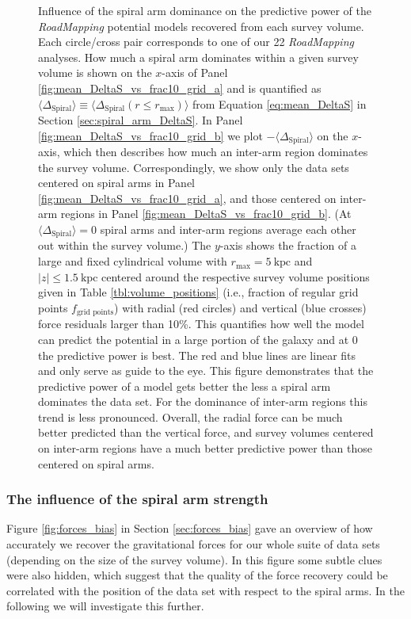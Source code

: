 \documentclass[iop,revtex4,numberedappendix,appendixfloats]{emulateapj}
\newcommand{\RM}{{\sl RoadMapping}}
\begin{document}
\begin{figure}[!htbp]
\caption{Influence of the spiral arm dominance on the predictive power of the \RM{} potential models recovered from each survey volume. Each circle/cross pair corresponds to one of our 22 \RM{} analyses. How much a spiral arm dominates within a given survey volume is shown on the $x$-axis of Panel \ref{fig:mean_DeltaS_vs_frac10_grid_a} and is quantified as $\langle \Delta_\text{Spiral} \rangle \equiv \langle \Delta_\text{Spiral}(r\leq r_\text{max})\rangle$ from Equation \eqref{eq:mean_DeltaS} in Section \ref{sec:spiral_arm_DeltaS}. In Panel \ref{fig:mean_DeltaS_vs_frac10_grid_b} we plot $-\langle \Delta_\text{Spiral}\rangle$ on the $x$-axis, which then describes how much an inter-arm region dominates the survey volume. Correspondingly, we show only the data sets centered on spiral arms in Panel \ref{fig:mean_DeltaS_vs_frac10_grid_a}, and those centered on inter-arm regions in Panel \ref{fig:mean_DeltaS_vs_frac10_grid_b}. (At $\langle \Delta_\text{Spiral} \rangle=0$ spiral arms and inter-arm regions average each other out within the survey volume.) The $y$-axis shows the fraction of a large and fixed cylindrical volume with $r_\text{max}=5~\text{kpc}$ and $|z| \leq 1.5~\text{kpc}$ centered around the respective survey volume positions given in Table \ref{tbl:volume_positions} (i.e., fraction of regular grid points  $f_\text{grid points}$) with radial (red circles) and vertical (blue crosses) force residuals larger than 10\%.  This quantifies how well the model can predict the potential in a large portion of the galaxy and at $0$ the predictive power is best. The red and blue lines are linear fits and only serve as guide to the eye. This figure demonstrates that the predictive power of a model gets better the less a spiral arm dominates the data set. For the dominance of inter-arm regions this trend is less pronounced. Overall, the radial force can be much better predicted than the vertical force, and survey volumes centered on inter-arm regions have a much better predictive power than those centered on spiral arms.}
\label{fig:mean_DeltaS_vs_frac10_grid}
\end{figure}



\subsubsection{The influence of the spiral arm strength} \label{sec:spiral_arms_and_forces}

Figure \ref{fig:forces_bias} in Section \ref{sec:forces_bias} gave an overview of how accurately we recover the gravitational forces for our whole suite of data sets (depending on the size of the survey volume). In this figure some subtle clues were also hidden, which suggest that the quality of the force recovery could be correlated with the position of the data set with respect to the spiral arms. In the following we will investigate this further.
\end{document}
